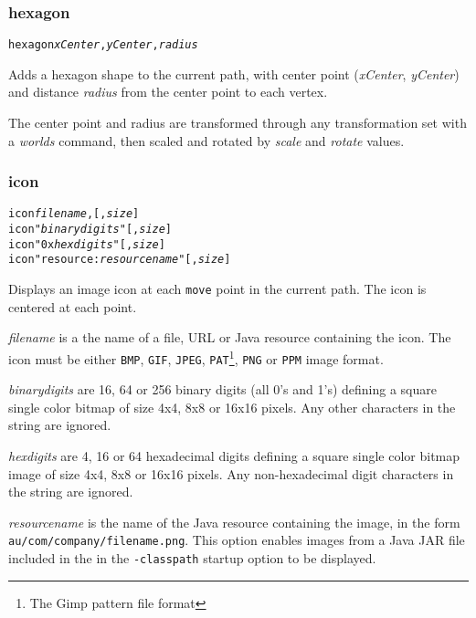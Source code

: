 \subsubsection{hexagon}

\begin{alltt}
hexagon \textit{xCenter}, \textit{yCenter}, \textit{radius}
\end{alltt}

Adds a hexagon shape to the current path, with center
point (\textit{xCenter}, \textit{yCenter}) and distance
\textit{radius}
from the center point to each vertex.

The center point and radius are transformed through any
transformation set with a \textit{worlds} command,
then scaled and rotated by \textit{scale}
and \textit{rotate} values.

\subsubsection{icon}

\begin{alltt}
icon \textit{filename}, [, \textit{size}]
icon "\textit{binarydigits}" [, \textit{size}]
icon "0x\textit{hexdigits}" [, \textit{size}]
icon "resource:\textit{resourcename}" [, \textit{size}]
\end{alltt}

Displays an image icon at each \texttt{move} point in
the current path.  The icon is centered at each point.

\textit{filename} is a the name of a file, URL or Java resource
containing the icon.
The icon must be either \texttt{BMP}, \texttt{GIF}, \texttt{JPEG},
\texttt{PAT}\footnote{The Gimp pattern file format},
\texttt{PNG} or \texttt{PPM} image format.

\textit{binarydigits} are 16, 64 or 256 binary digits (all 0's and 1's)
defining a square single color bitmap of size 4x4, 8x8 or 16x16 pixels.
Any other characters in the string are ignored.

\textit{hexdigits} are 4, 16 or 64 hexadecimal digits defining
a square single color bitmap image of size 4x4, 8x8 or 16x16 pixels.
Any non-hexadecimal digit characters in the string are ignored.

\textit{resourcename} is the name of the Java resource containing the
image, in the form \texttt{au/com/company/filename.png}.
This option enables images from a Java JAR file included in the 
in the \texttt{-classpath} startup option to be displayed.

